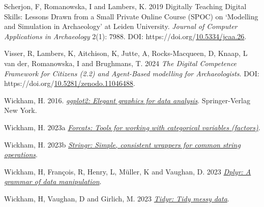 \documentclass[
]{article}
\newlength{\cslhangindent}
\newlength{\cslentryspacingunit} %
\newenvironment{CSLReferences}[2] %
 {%
  \setlength{\parindent}{0pt}
  \ifodd #1
  \let\oldpar\par
  \def\par{\hangindent=\cslhangindent\oldpar}
  \fi
  \setlength{\parskip}{#2\cslentryspacingunit}
 }%
 {}
\begin{document}
\begin{CSLReferences}{1}{0}
\leavevmode{}%
Scherjon, F, Romanowska, I and Lambers, K. 2019 Digitally Teaching Digital Skills: Lessons Drawn from a Small Private Online Course (SPOC) on {`}Modelling and Simulation in Archaeology{'} at Leiden University. \emph{Journal of Computer Applications in Archaeology} 2(1): 7988. DOI: https://doi.org/\href{https://doi.org/10.5334/jcaa.26}{10.5334/jcaa.26}.

\leavevmode{}%
Visser, R, Lambers, K, Aitchison, K, Jutte, A, Rocks-Macqueen, D, Knaap, L van der, Romanowska, I and Brughmans, T. 2024 \emph{The Digital Competence Framework for Citizens (2.2) and Agent-Based modelling for Archaeologists}. DOI: https://doi.org/\href{https://doi.org/10.5281/zenodo.11046488}{10.5281/zenodo.11046488}.

\leavevmode{}%
Wickham, H. 2016. \emph{\href{http://ggplot2.org}{ggplot2: Elegant graphics for data analysis}}. Springer-Verlag New York.

\leavevmode{}%
Wickham, H. 2023a \emph{\href{https://forcats.tidyverse.org/}{Forcats: Tools for working with categorical variables (factors)}}.

\leavevmode{}%
Wickham, H. 2023b \emph{\href{https://stringr.tidyverse.org}{Stringr: Simple, consistent wrappers for common string operations}}.

\leavevmode{}%
Wickham, H, François, R, Henry, L, Müller, K and Vaughan, D. 2023 \emph{\href{https://dplyr.tidyverse.org}{Dplyr: A grammar of data manipulation}}.

\leavevmode{}%
Wickham, H, Vaughan, D and Girlich, M. 2023 \emph{\href{https://tidyr.tidyverse.org}{Tidyr: Tidy messy data}}.

\end{CSLReferences}
\end{document}
